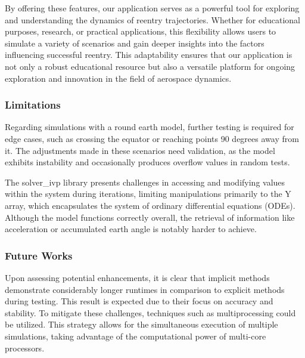 \documentclass[runningheads]{llncs}
\begin{document}
By offering these features, our application serves as a powerful tool for exploring and understanding the dynamics of reentry trajectories. Whether for educational purposes, research, or practical applications, this flexibility allows users to simulate a variety of scenarios and gain deeper insights into the factors influencing successful reentry. This adaptability ensures that our application is not only a robust educational resource but also a versatile platform for ongoing exploration and innovation in the field of aerospace dynamics.


\subsubsection*{Limitations}

Regarding simulations with a round earth model, further testing is required for edge cases, such as crossing the equator or reaching points 90 degrees away from it. The adjustments made in these scenarios need validation, as the model exhibits instability and occasionally produces overflow values in random tests.

The solver\_ivp library presents challenges in accessing and modifying values within the system during iterations, limiting manipulations primarily to the Y array, which encapsulates the system of ordinary differential equations (ODEs). Although the model functions correctly overall, the retrieval of information like acceleration or accumulated earth angle is notably harder to achieve. 


\subsubsection*{Future Works}

Upon assessing potential enhancements, it is clear that implicit methods demonstrate considerably longer runtimes in comparison to explicit methods during testing. This result is expected due to their focus on accuracy and stability. To mitigate these challenges, techniques such as multiprocessing could be utilized. This strategy allows for the simultaneous execution of multiple simulations, taking advantage of the computational power of multi-core processors.





\end{document}
